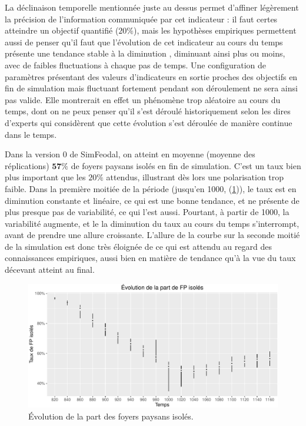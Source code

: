 La \og déclinaison temporelle\fg{} mentionnée juste au dessus permet d'affiner légèrement la précision de l'information communiquée par cet indicateur :
il faut certes atteindre un objectif quantifié ($20\%$), mais les hypothèses empiriques permettent aussi de penser qu'il faut que l'évolution de cet indicateur au cours du temps présente une tendance stable à la diminution
, diminuant ainsi plus ou moins, avec de faibles fluctuations à chaque pas de temps.
Une configuration de paramètres présentant des valeurs d'indicateurs en sortie proches des objectifs en fin de simulation mais fluctuant fortement pendant son déroulement ne sera ainsi pas valide.
Elle montrerait en effet  un phénomène trop aléatoire au cours du temps, dont on ne peux penser qu'il s'est déroulé historiquement selon les dires d'experts qui considèrent que cette évolution s'est déroulée de manière continue dans le temps.

\begin{mdframed}[backgroundcolor=gray!10,footnoteinside=false]

Dans la version 0 de SimFeodal, on atteint en moyenne (moyenne des réplications) $\textbf{57\%}$ de foyers paysans isolés en fin de simulation.
C'est un taux bien plus important que les $20\%$ attendus, illustrant dès lors une polarisation trop faible.
Dans la première moitiée de la période (jusqu'en 1000, (\cref{fig:taux-isoles-v0})), le taux est en diminution constante et linéaire, ce qui est une bonne tendance, et ne présente de plus presque pas de variabilité, ce qui l'est aussi.
Pourtant, à partir de 1000, la variabilité augmente, et le la diminution du taux au cours du temps s'interrompt, avant de prendre une allure croissante.
L'allure de la courbe sur la seconde moitié de la simulation est donc très éloignée de ce qui est attendu au regard des connaissances empiriques, aussi bien en matière de tendance qu'à la vue du taux décevant atteint au final.
\end{mdframed}

\begin{figure}[H]
\captionsetup{width=\linewidth}
\includegraphics[width=\linewidth]{img/resultats/v0_taux_FP_isoles.pdf}
\caption{Évolution de la part des foyers paysans isolés.} 
\label{fig:taux-isoles-v0} 
\end{figure}

